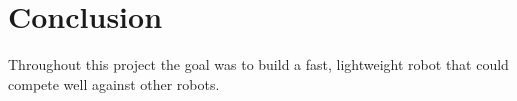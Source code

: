 \section{Conclusion}

Throughout this project the goal was to build a fast, lightweight robot that could compete well against other robots. 